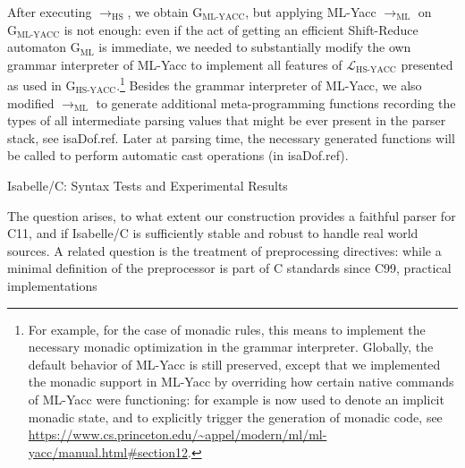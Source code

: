 \begin{isabellebody}
\begin{isamarkuptext}
After executing $\longrightarrow_{\text{HS}}$, we obtain $\text{G}_{\text{ML-YACC}}$, but applying
ML-Yacc $\longrightarrow_{\text{ML}}$ on $\text{G}_{\text{ML-YACC}}$ is not enough: even if the act
of getting an efficient Shift-Reduce automaton $\text{G}_{\text{ML}}$ is immediate, we needed to
substantially modify the own grammar interpreter of ML-Yacc to implement all features of
$\mathcal{L}_{\text{HS-YACC}}$ presented as used in $\text{G}_{\text{HS-YACC}}$.\footnote{For example, for the case of monadic rules, this means to implement the necessary monadic
  optimization in the grammar interpreter. Globally, the default behavior of ML-Yacc is still
  preserved, except that we implemented the monadic support in ML-Yacc by overriding how certain
  native commands of ML-Yacc were functioning: for example  is now
  used to denote an implicit monadic state, and  to explicitly
  trigger the generation of monadic code, see
  \url{https://www.cs.princeton.edu/~appel/modern/ml/ml-yacc/manual.html\#section12}.}
Besides the grammar interpreter of ML-Yacc, we also modified $\longrightarrow_{\text{ML}}$ to
generate additional meta-programming functions recording the types of all intermediate parsing
values that might be ever present in the parser stack, see \csname isaDof.ref. Later at parsing time, the necessary generated functions will be
called to perform automatic cast operations (in \csname isaDof.ref).%
\end{isamarkuptext}\isamarkuptrue%
%
\begin{isamarkupsection*}%
[label = {ctests},type = {scholarly_paper.technical}, args={label = {ctests},type = {scholarly_paper.technical}, scholarly_paper.text_section.main_author = {@{docitem ''fred''}}, Isa_COL.text_element.level = {}, Isa_COL.text_element.referentiable = {False}, Isa_COL.text_element.variants = {{STR ''outline'', STR ''document''}}, scholarly_paper.text_section.fixme_list = {}, Isa_COL.text_element.level = {}, scholarly_paper.technical.definition_list = {}}]Isabelle/C: Syntax Tests and Experimental Results%
\end{isamarkupsection*}\isamarkuptrue%
%
\begin{isamarkuptext}%
The question arises, to what extent our construction provides a faithful parser for
C11, and if Isabelle/C is sufficiently stable and robust to handle real world sources. A related
question is the treatment of  preprocessing directives: while a
minimal definition of the preprocessor is part of C standards since C99, practical implementations

\end{isamarkuptext}
\end{isabellebody}
